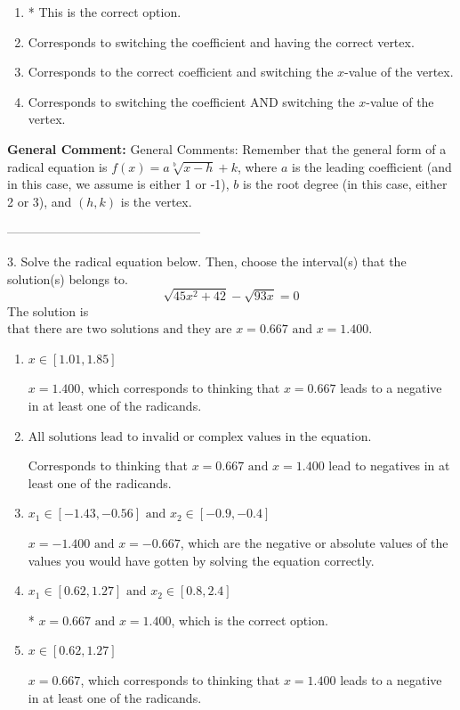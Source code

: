\documentclass{extbook}[14pt]
\begin{document}
\begin{enumerate}[label=\Alph*.] 
\item * This is the correct option.  
\item Corresponds to switching the coefficient and having the correct vertex.  
\item Corresponds to the correct coefficient and switching the $x$-value of the vertex.  
\item Corresponds to switching the coefficient AND switching the $x$-value of the vertex.  
\end{enumerate} 
 
\textbf{General Comment:} General Comments: Remember that the general form of a radical equation is $ f(x) = a \sqrt[b]{x - h} + k $, where $a$ is the leading coefficient (and in this case, we assume is either 1 or -1), $b$ is the root degree (in this case, either 2 or 3), and $(h, k)$ is the vertex. 

-----------------------------------------------

3. Solve the radical equation below. Then, choose the interval(s) that the solution(s) belongs to.
\[ \sqrt{45 x^2 + 42} - \sqrt{93 x} = 0 \] 
The solution is $ \text{that there are two solutions and they are } x = 0.667 \text{ and } x = 1.400. $ 

\begin{enumerate}[label=\Alph*.] 
\item $ x \in [1.01,1.85] $ 

 $x = 1.400$, which corresponds to thinking that $x = 0.667$ leads to a negative in at least one of the radicands. 
\item $ \text{All solutions lead to invalid or complex values in the equation.} $ 

 Corresponds to thinking that $x = 0.667 \text{ and } x = 1.400$ lead to negatives in at least one of the radicands. 
\item $ x_1 \in [-1.43, -0.56] \text{ and } x_2 \in [-0.9,-0.4] $ 

 $x = -1.400 \text{ and } x = -0.667$, which are the negative or absolute values of the values you would have gotten by solving the equation correctly. 
\item $ x_1 \in [0.62, 1.27] \text{ and } x_2 \in [0.8,2.4] $ 

 * $x = 0.667 \text{ and } x = 1.400$, which is the correct option. 
\item $ x \in [0.62,1.27] $ 

 $x = 0.667$, which corresponds to thinking that $x = 1.400$ leads to a negative in at least one of the radicands. 
\end{enumerate} 
 
\end{document}
